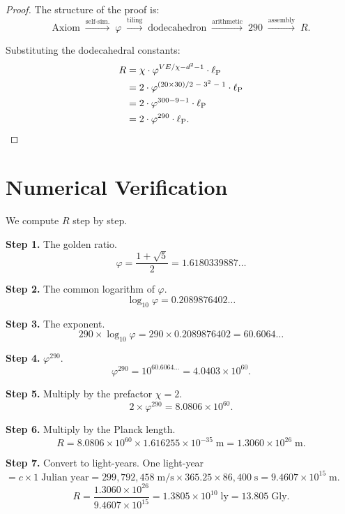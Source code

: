 \documentclass[11pt,a4paper]{article}
\theoremstyle{plain}
\theoremstyle{definition}
\newcommand{\lP}{\ell_{\mathrm{P}}}
\newcommand{\vp}{\varphi}
\begin{document}
\begin{proof}
The structure of the proof is:
\[
  \text{Axiom} \;\xrightarrow{\text{self-sim.}}\; \vp
  \;\xrightarrow{\text{tiling}}\; \text{dodecahedron}
  \;\xrightarrow{\text{arithmetic}}\; 290
  \;\xrightarrow{\text{assembly}}\; R.
\]

Substituting the dodecahedral constants:
\begin{align*}
  R &= \chi \cdot \vp^{VE/\chi - d^2 - 1} \cdot \lP \\
    &= 2 \cdot \vp^{(20 \times 30)/2 \;-\; 3^2 \;-\; 1} \cdot \lP \\
    &= 2 \cdot \vp^{300 - 9 - 1} \cdot \lP \\
    &= 2 \cdot \vp^{290} \cdot \lP. \qedhere
\end{align*}
\end{proof}

\section{Numerical Verification}\label{sec:verify}

We compute $R$ step by step.

\medskip\noindent
\textbf{Step 1.}  The golden ratio.
\[
  \vp = \frac{1 + \sqrt{5}}{2} = 1.6180339887\ldots
\]

\textbf{Step 2.}  The common logarithm of $\vp$.
\[
  \log_{10}\vp = 0.2089876402\ldots
\]

\textbf{Step 3.}  The exponent.
\[
  290 \times \log_{10}\vp = 290 \times 0.2089876402 = 60.6064\ldots
\]

\textbf{Step 4.}  $\vp^{290}$.
\[
  \vp^{290} = 10^{60.6064\ldots} = 4.0403 \times 10^{60}.
\]

\textbf{Step 5.}  Multiply by the prefactor $\chi = 2$.
\[
  2 \times \vp^{290} = 8.0806 \times 10^{60}.
\]

\textbf{Step 6.}  Multiply by the Planck length.
\[
  R = 8.0806 \times 10^{60} \times 1.616255 \times 10^{-35}\;\text{m}
  = 1.3060 \times 10^{26}\;\text{m}.
\]

\textbf{Step 7.}  Convert to light-years.
One light-year $= c \times 1\;\text{Julian year}
= 299{,}792{,}458\;\text{m/s} \times 365.25 \times 86{,}400\;\text{s}
= 9.4607 \times 10^{15}\;\text{m}$.
\[
  R = \frac{1.3060 \times 10^{26}}{9.4607 \times 10^{15}}
  = 1.3805 \times 10^{10}\;\text{ly}
  = 13.805\;\text{Gly}.
\]
\end{document}
